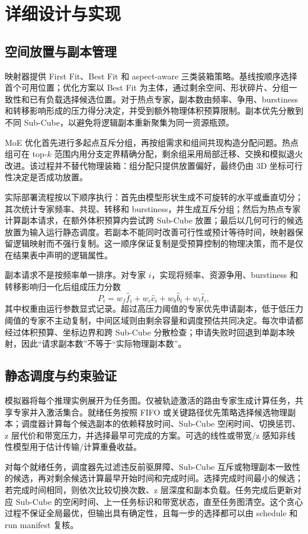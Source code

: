 \section{详细设计与实现}
\subsection{空间放置与副本管理}
映射器提供 First Fit、Best Fit 和 aspect-aware 三类装箱策略。基线按顺序选择首个可用位置；优化方案以 Best Fit 为主体，通过剩余空间、形状碎片、分组一致性和已有负载选择候选位置。对于热点专家，副本数由频率、争用、burstiness 和转移影响形成的压力得分决定，并受到额外物理体积预算限制。副本优先分散到不同 Sub-Cube，以避免将逻辑副本重新聚集为同一资源瓶颈。

MoE 优化首先进行多起点互斥分组，再按组需求和组间共现构造分配问题。热点组可在 top-$k$ 范围内用分支定界精确分配，剩余组采用局部迁移、交换和模拟退火改进。该过程并不替代物理装箱：组分配只提供放置偏好，最终仍由 3D 坐标可行性决定是否成功放置。

实际部署流程按以下顺序执行：首先由模型形状生成不可旋转的水平或垂直切分；其次统计专家频率、共现、转移和 burstiness，并生成互斥分组；然后为热点专家计算副本请求，在额外体积预算内尝试跨 Sub-Cube 放置；最后以几何可行的候选放置为输入运行静态调度。若副本不能同时改善可行性或预计等待时间，映射器保留逻辑映射而不强行复制。这一顺序保证复制是受预算控制的物理决策，而不是仅在结果表中声明的逻辑属性。

副本请求不是按频率单一排序。对专家 $i$，实现将频率、资源争用、burstiness 和转移影响归一化后组成压力分数
\begin{equation}
P_i=w_f\hat f_i+w_c\hat c_i+w_b\hat b_i+w_t\hat t_i,
\end{equation}
其中权重由运行参数显式记录。超过高压力阈值的专家优先申请副本，低于低压力阈值的专家不主动复制，中间区域则由剩余容量和调度预估共同决定。每次申请都经过体积预算、坐标边界和跨 Sub-Cube 分散检查；申请失败时回退到单副本映射，因此“请求副本数”不等于“实际物理副本数”。

\subsection{静态调度与约束验证}
模拟器将每个推理实例展开为任务图。仅被轨迹激活的路由专家生成计算任务，共享专家并入激活集合。就绪任务按照 FIFO 或关键路径优先策略选择候选物理副本；调度器计算每个候选副本的依赖释放时间、Sub-Cube 空闲时间、切换惩罚、z 层代价和带宽压力，并选择最早可完成的方案。可选的线性或带宽/z 感知非线性模型用于估计传输/计算重叠收益。

对每个就绪任务，调度器先过滤违反前驱屏障、Sub-Cube 互斥或物理副本一致性的候选，再对剩余候选计算最早开始时间和完成时间。选择完成时间最小的候选；若完成时间相同，则依次比较切换次数、z 层深度和副本负载。任务完成后更新对应 Sub-Cube 的空闲时间、上一任务标识和带宽状态，直至任务图清空。这个贪心过程不保证全局最优，但输出具有确定性，且每一步的选择都可以由 schedule 和 run manifest 复核。

